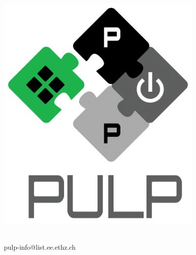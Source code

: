 \makeatletter
\begin{titlepage}

 \thispagestyle{empty}

 \begin{center}

  \begin{spacing}{2.0}
  {\Huge\textbf{\@title}}
  \end{spacing}

  \vspace{0.2cm}

  \vfill

  \includegraphics[height = 12cm]{figures/pulp_logo} \\

  \vfill

  {\Large \@author}\\
  {pulp-info@list.ee.ethz.ch}
  \vfill
  \@date

 \end{center}
\end{titlepage}
\makeatother

